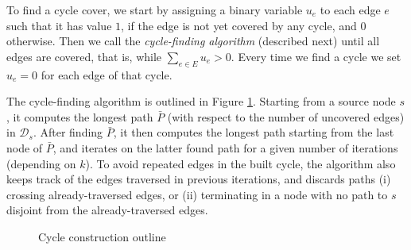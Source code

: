 To find a cycle cover, we start by assigning a binary variable $u_{e}$ to each 
edge $e$ such that it has value $1$, if the edge is not yet covered by any cycle,
and $0$ otherwise. Then we call the \textit{cycle-finding algorithm} (described next)
until all edges are covered, that is, while $\sum_{e \in E} u_e > 0$. Every time
we find a cycle we set $u_e = 0$ for each edge of that cycle.

The cycle-finding algorithm is outlined in Figure \ref{figure:cycles}.
Starting from a source node $s$, it computes the longest path $\bar P$ (with
respect to the number of uncovered edges) in $\mathcal{D}_s$. After finding
$\bar P$, it then computes the longest path starting from the last node of $\bar
P$, and iterates on the latter found path for a given number of iterations
(depending on $k$). To avoid repeated edges in the built cycle, the algorithm
also keeps track of the edges traversed in previous iterations, and discards
paths (i) crossing already-traversed edges, or (ii) terminating in a node with
no path to $s$ disjoint from the already-traversed edges.

\begin{figure}[htb]
\begin{center}
\end{center}
\caption{Cycle construction outline}
\label{figure:cycles}
\end{figure}

